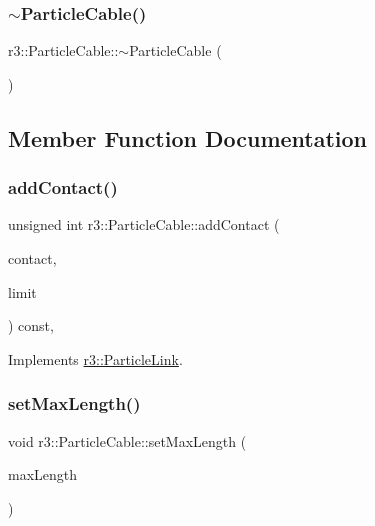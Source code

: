 \subsubsection{\texorpdfstring{$\sim$\+Particle\+Cable()}{~ParticleCable()}}
{\footnotesize\ttfamily r3\+::\+Particle\+Cable\+::$\sim$\+Particle\+Cable (\begin{DoxyParamCaption}{ }\end{DoxyParamCaption})\hspace{0.3cm}{\ttfamily [default]}}



\subsection{Member Function Documentation}
\mbox{\label{classr3_1_1_particle_cable_af8024236316ae2cf7bd68a0e906ed7c7}} 
\subsubsection{\texorpdfstring{add\+Contact()}{addContact()}}
{\footnotesize\ttfamily unsigned int r3\+::\+Particle\+Cable\+::add\+Contact (\begin{DoxyParamCaption}\item[{\mbox{\hyperlink{classr3_1_1_particle_contact}{Particle\+Contact}} $\ast$}]{contact,  }\item[{unsigned int}]{limit }\end{DoxyParamCaption}) const\hspace{0.3cm}{\ttfamily [override]}, {\ttfamily [virtual]}}



Implements \mbox{\hyperlink{classr3_1_1_particle_link_a07abe1381e0b5ed7e1597099dc0c072d}{r3\+::\+Particle\+Link}}.

\mbox{\label{classr3_1_1_particle_cable_a6cf3d6cff00fa5a7eeb1df8975cd59de}} 
\subsubsection{\texorpdfstring{set\+Max\+Length()}{setMaxLength()}}
{\footnotesize\ttfamily void r3\+::\+Particle\+Cable\+::set\+Max\+Length (\begin{DoxyParamCaption}\item[{\mbox{\hyperlink{namespacer3_ab2016b3e3f743fb735afce242f0dc1eb}{real}}}]{max\+Length }\end{DoxyParamCaption})}

